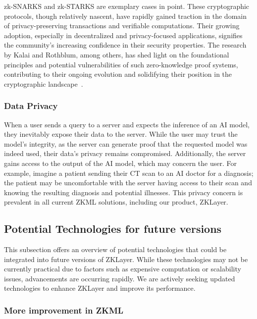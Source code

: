 \documentclass[conference]{IEEEtran}
\begin{document}
zk-SNARKS and zk-STARKS are exemplary cases in point. These cryptographic protocols, though relatively nascent, have rapidly gained traction in the domain of privacy-preserving transactions and veriﬁable computations. Their growing adoption, especially in decentralized and privacy-focused applications, signiﬁes the community’s increasing conﬁdence in their security properties. The research by Kalai and Rothblum, among others, has shed light on the foundational principles and potential vulnerabilities of such zero-knowledge proof systems, contributing to their ongoing evolution and solidifying their position in the cryptographic landscape~\cite{Kalai2017FromOT}.

\subsubsection{Data Privacy}

When a user sends a query to a server and expects the inference of an AI model, they inevitably expose their data to the server. While the user may trust the model's integrity, as the server can generate proof that the requested model was indeed used, their data's privacy remains compromised. Additionally, the server gains access to the output of the AI model, which may concern the user. For example, imagine a patient sending their CT scan to an AI doctor for a diagnosis; the patient may be uncomfortable with the server having access to their scan and knowing the resulting diagnosis and potential illnesses. This privacy concern is prevalent in all current ZKML solutions, including our product, ZKLayer.


\subsection{Potential Technologies for future versions}

This subsection offers an overview of potential technologies that could be integrated into future versions of ZKLayer. While these technologies may not be currently practical due to factors such as expensive computation or scalability issues, advancements are occurring rapidly. We are actively seeking updated technologies to enhance ZKLayer and improve its performance.


\subsubsection{More improvement in ZKML}
\end{document}

